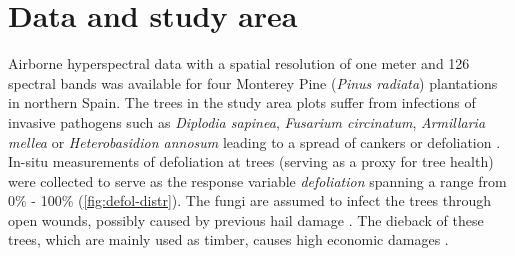 \documentclass[letterpaper, journal]{IEEEtran}
\begin{document}
%




\section{Data and study area}

\noindent Airborne hyperspectral data with a spatial resolution of one meter and 126 spectral bands was available for four Monterey Pine (\textit{Pinus radiata}) plantations in northern Spain.
The trees in the study area plots suffer from infections of invasive pathogens such as \textit{Diplodia sapinea}, \textit{Fusarium circinatum}, \textit{Armillaria mellea} or \textit{Heterobasidion annosum} leading to a spread of cankers or defoliation \cite{mesanza2016, iturritxa2017}.
In-situ measurements of defoliation at trees (serving as a proxy for tree health) were collected to serve as the response variable \textit{defoliation} spanning a range from 0\% - 100\% (\autoref{fig:defol-distr}).
The fungi are assumed to infect the trees through open wounds, possibly caused by previous hail damage \cite{iturritxa2014}.
The dieback of these trees, which are mainly used as timber, causes high economic damages \cite{ganley2009}.
\end{document}
